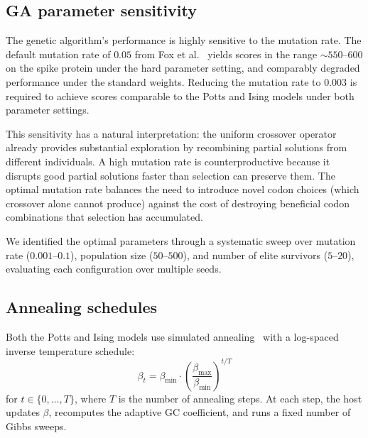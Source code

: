 \documentclass[11pt]{article}
\begin{document}
\subsection*{GA parameter sensitivity}

The genetic algorithm's performance is highly sensitive to the mutation rate.
The default mutation rate of $0.05$ from Fox et al.~\cite{fox2021mrna} yields scores in the range ${\sim}550$--$600$ on the spike protein under the hard parameter setting, and comparably degraded performance under the standard weights.
Reducing the mutation rate to $0.003$ is required to achieve scores comparable to the Potts and Ising models under both parameter settings.

This sensitivity has a natural interpretation: the uniform crossover operator already provides substantial exploration by recombining partial solutions from different individuals.
A high mutation rate is counterproductive because it disrupts good partial solutions faster than selection can preserve them.
The optimal mutation rate balances the need to introduce novel codon choices (which crossover alone cannot produce) against the cost of destroying beneficial codon combinations that selection has accumulated.

We identified the optimal parameters through a systematic sweep over mutation rate ($0.001$--$0.1$), population size ($50$--$500$), and number of elite survivors ($5$--$20$), evaluating each configuration over multiple seeds.

\subsection*{Annealing schedules}

Both the Potts and Ising models use simulated annealing~\cite{kirkpatrick1983sa} with a log-spaced inverse temperature schedule:
\begin{equation}\label{eq:beta-schedule}
  \beta_t = \beta_{\mathrm{min}} \cdot \left( \frac{\beta_{\mathrm{max}}}{\beta_{\mathrm{min}}} \right)^{t/T}
\end{equation}
for $t \in \{0, \ldots, T\}$, where $T$ is the number of annealing steps.
At each step, the host updates $\beta$, recomputes the adaptive GC coefficient, and runs a fixed number of Gibbs sweeps.
\end{document}
